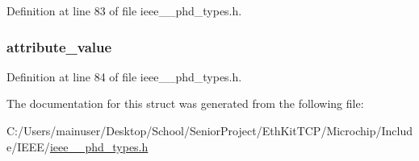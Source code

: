 Definition at line 83 of file ieee\+\_\+\_\+phd\+\_\+types.\+h.

\hypertarget{struct___a_v_a___type_a7b6c0cc70cd2d8cbc023b5a699487fbc}{}
\subsubsection[{attribute\+\_\+value}]{ attribute\+\_\+value}\label{struct___a_v_a___type_a7b6c0cc70cd2d8cbc023b5a699487fbc}


Definition at line 84 of file ieee\+\_\+\_\+phd\+\_\+types.\+h.



The documentation for this struct was generated from the following file\+:\begin{DoxyCompactItemize}
\item 
C\+:/\+Users/mainuser/\+Desktop/\+School/\+Senior\+Project/\+Eth\+Kit\+T\+C\+P/\+Microchip/\+Include/\+I\+E\+E\+E/\hyperlink{ieee__11073__phd__types_8h}{ieee\+\_\+\_\+phd\+\_\+types.\+h}\end{DoxyCompactItemize}
